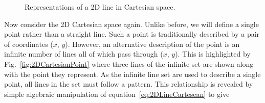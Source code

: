 \begin{figure}%
  \centering
  \hspace{1em}
  \caption{Representations of a 2D line in Cartesian space.}
  \label{fig:2DCartesianLineAndParameterPoint}
\end{figure}
\newline
\newline
Now consider the 2D Cartesian space again.  Unlike before, we will define a single point rather than a straight line. Such a point is traditionally described by a pair of coordinates ($x$, $y$).  However, an alternative description of the point is an infinite number of lines all of which pass through ($x$, $y$).  This is highlighted by Fig.~\ref{fig:2DCartesianPoint} where three lines of the infinite set are shown along with the point they represent.  As the infinite line set are used to describe a single point, all lines in the set must follow a pattern.  This relationship is revealed by simple algebraic manipulation of equation~\ref{eq:2DLineCartesean} to give
